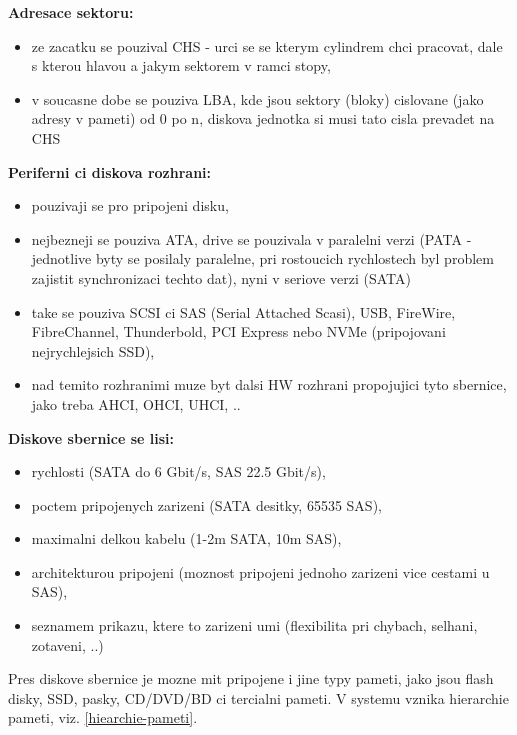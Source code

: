 \documentclass[a4paper, 11pt]{article}
\begin{document}
\noindent\textbf{Adresace sektoru:}
\begin{itemize}
    \item ze zacatku se pouzival CHS - urci se se kterym cylindrem chci pracovat, dale s kterou hlavou a jakym sektorem v ramci stopy,
    \item v soucasne dobe se pouziva LBA, kde jsou sektory (bloky) cislovane (jako adresy v pameti) od 0 po n, diskova jednotka si musi tato cisla prevadet na CHS \\

\end{itemize}

\noindent\textbf{Periferni ci diskova rozhrani:}
\begin{itemize}
    \item pouzivaji se pro pripojeni disku,
    \item nejbezneji se pouziva ATA, drive se pouzivala v paralelni verzi (PATA - jednotlive byty se posilaly paralelne, pri rostoucich rychlostech byl problem zajistit synchronizaci techto dat), nyni v seriove verzi (SATA)
    \item take se pouziva SCSI ci SAS (Serial Attached Scasi), USB, FireWire, FibreChannel, Thunderbold, PCI Express nebo NVMe (pripojovani nejrychlejsich SSD),
    \item nad temito rozhranimi muze byt dalsi HW rozhrani propojujici tyto sbernice, jako treba AHCI, OHCI, UHCI, .. \\
\end{itemize}

\newpage

\noindent\textbf{Diskove sbernice se lisi:}
\begin{itemize}
    \item rychlosti (SATA do 6 Gbit/s, SAS 22.5 Gbit/s),
    \item poctem pripojenych zarizeni (SATA desitky, 65535 SAS),
    \item maximalni delkou kabelu (1-2m SATA, 10m SAS),
    \item architekturou pripojeni (moznost pripojeni jednoho zarizeni vice cestami u SAS),
    \item seznamem prikazu, ktere to zarizeni umi (flexibilita pri chybach, selhani, zotaveni, ..) \\
\end{itemize}

Pres diskove sbernice je mozne mit pripojene i jine typy pameti, jako jsou flash disky, SSD, pasky, CD/DVD/BD ci tercialni pameti. V systemu vznika hierarchie pameti, viz. \ref{hiearchie-pameti}. \\
\end{document}
